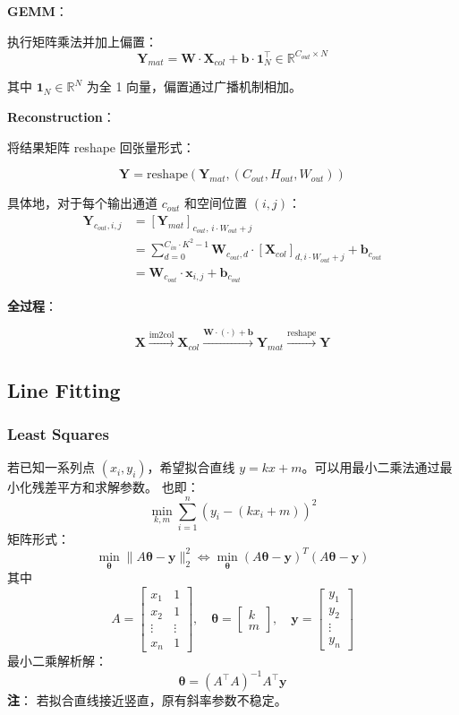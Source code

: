\textbf{GEMM}：

执行矩阵乘法并加上偏置： \[
\mathbf{Y}_{mat}
= \mathbf{W} \cdot \mathbf{X}_{col} + \mathbf{b} \cdot \mathbf{1}_N^\top \in \mathbb{R}^{C_{out} \times N}
\]

其中 \(\mathbf{1}_N \in \mathbb{R}^{N}\) 为全 1
向量，偏置通过广播机制相加。

\textbf{Reconstruction}：

将结果矩阵 reshape 回张量形式：

\[
\mathbf{Y} = \text{reshape}\left(\mathbf{Y}_{mat}, (C_{out}, H_{out}, W_{out})\right)
\]

具体地，对于每个输出通道 \(c_{out}\) 和空间位置 \((i, j)\)： \[
\begin{aligned}
\mathbf{Y}_{c_{out}, i, j}
&= \left[\mathbf{Y}_{mat}\right]_{c_{out},\, i \cdot W_{out} + j} \\
&= \sum_{d=0}^{C_{in} \cdot K^2 - 1} \mathbf{W}_{c_{out}, d} \cdot
\left[\mathbf{X}_{col}\right]_{d, i \cdot W_{out} + j} + \mathbf{b}_{c_{out}} \\
&= \mathbf{W}_{c_{out}} \cdot \mathbf{x}_{i, j} + \mathbf{b}_{c_{out}}
\end{aligned}
\]

\textbf{全过程}：

\[
\mathbf{X}
\xrightarrow{\text{im2col}} \mathbf{X}_{col}
\xrightarrow{\mathbf{W} \cdot (\cdot) + \mathbf{b}} \mathbf{Y}_{mat}
\xrightarrow{\text{reshape}} \mathbf{Y}
\]

\subsection{Line Fitting}\label{line-fitting}

\subsubsection{Least Squares}\label{least-squares}

若已知一系列点 \((x_i, y_i)\)，希望拟合直线
\(y = kx + m\)。可以用最小二乘法通过最小化残差平方和求解参数。 也即： \[
\min_{k,m} \sum_{i=1}^n (y_i - (k x_i + m))^2
\] 矩阵形式： \[
\min_{\boldsymbol{\theta}} \| A\boldsymbol{\theta} - \boldsymbol{y} \|_2^2
\Leftrightarrow \min_{\boldsymbol{\theta}} (A\boldsymbol{\theta} - \boldsymbol{y})^T (A\boldsymbol{\theta} - \boldsymbol{y})
\] 其中 \[
A = \begin{bmatrix} x_1 & 1 \\ x_2 & 1 \\ \vdots & \vdots \\ x_n & 1 \end{bmatrix},\quad
\boldsymbol{\theta} = \begin{bmatrix} k \\ m \end{bmatrix},\quad
\boldsymbol{y} = \begin{bmatrix} y_1 \\ y_2 \\ \vdots \\ y_n \end{bmatrix}
\] 最小二乘解析解： \[
\boldsymbol{\theta} = (A^\top A)^{-1} A^\top \boldsymbol{y}
\] \textbf{注}： 若拟合直线接近竖直，原有斜率参数不稳定。

